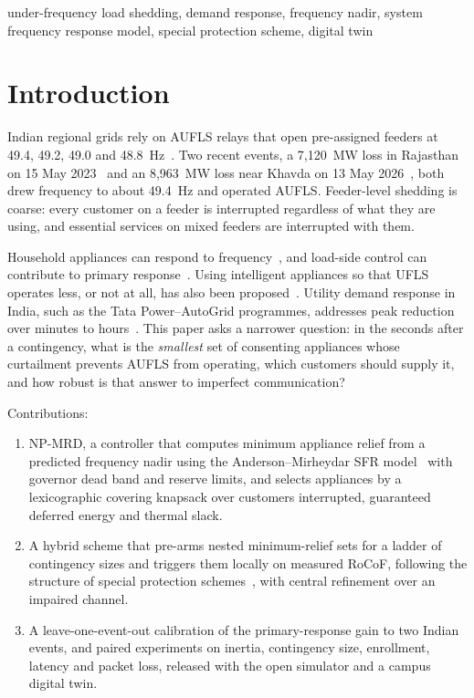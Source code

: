 \documentclass[conference]{IEEEtran}
\begin{document}
\begin{IEEEkeywords}
under-frequency load shedding, demand response, frequency nadir, system frequency response model, special protection scheme, digital twin
\end{IEEEkeywords}

\section{Introduction}
Indian regional grids rely on AUFLS relays that open pre-assigned feeders at 49.4, 49.2, 49.0 and 48.8~Hz~\cite{srpc2024}. Two recent events, a 7{,}120~MW loss in Rajasthan on 15 May 2023~\cite{nerpc2023} and an 8{,}963~MW loss near Khavda on 13 May 2026~\cite{erpc2026}, both drew frequency to about 49.4~Hz and operated AUFLS. Feeder-level shedding is coarse: every customer on a feeder is interrupted regardless of what they are using, and essential services on mixed feeders are interrupted with them.

Household appliances can respond to frequency~\cite{short2007,molina2011}, and load-side control can contribute to primary response~\cite{zhao2014}. Using intelligent appliances so that UFLS operates less, or not at all, has also been proposed~\cite{wang2016}. Utility demand response in India, such as the Tata Power--AutoGrid programmes, addresses peak reduction over minutes to hours~\cite{tatapower}. This paper asks a narrower question: in the seconds after a contingency, what is the \emph{smallest} set of consenting appliances whose curtailment prevents AUFLS from operating, which customers should supply it, and how robust is that answer to imperfect communication?

Contributions:
\begin{enumerate}
\item NP-MRD, a controller that computes minimum appliance relief from a predicted frequency nadir using the Anderson--Mirheydar SFR model~\cite{anderson1990} with governor dead band and reserve limits, and selects appliances by a lexicographic covering knapsack over customers interrupted, guaranteed deferred energy and thermal slack.
\item A hybrid scheme that pre-arms nested minimum-relief sets for a ladder of contingency sizes and triggers them locally on measured RoCoF, following the structure of special protection schemes~\cite{anderson1996}, with central refinement over an impaired channel.
\item A leave-one-event-out calibration of the primary-response gain to two Indian events, and paired experiments on inertia, contingency size, enrollment, latency and packet loss, released with the open simulator and a campus digital twin.
\end{enumerate}
\end{document}
